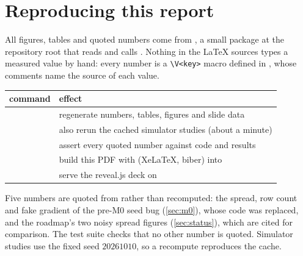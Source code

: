 \section{Reproducing this report}
\label{app:reproduce}

All figures, tables and quoted numbers come from , a small package at the repository
root that reads  and calls . Nothing in the \LaTeX{} sources types a
measured value by hand: every number is a \verb|\V<key>| macro defined in
, whose comments name the source of each value.

\begin{center}
\begin{tabular}{L{6.2cm}L{8.8cm}}
  \toprule
  command & effect \\
  \midrule
   & regenerate numbers, tables, figures and slide data \\
   & also rerun the cached simulator studies (about a minute) \\
   & assert every quoted number against code and results \\
   & build this PDF with  (XeLaTeX, biber) into  \\
   & serve the reveal.js deck on  \\
  \bottomrule
\end{tabular}
\end{center}

Five numbers are quoted from  rather than recomputed: the spread, row count
and fake gradient of the pre-M0 seed bug (\cref{sec:m0}), whose code was replaced, and the
roadmap's two noisy spread figures (\cref{sec:status}), which are cited for comparison.
The test suite checks that no other number is quoted. Simulator studies use the fixed seed
$20261010$, so a recompute reproduces the cache.
